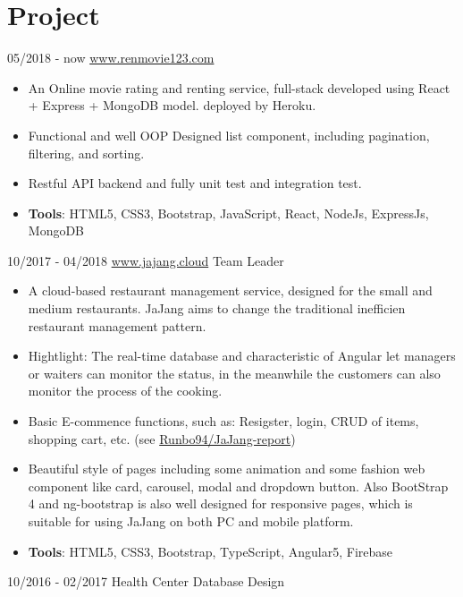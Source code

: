 \documentclass[letterpaper]{twentysecondcv} %
\begin{document}
\section{Project}
\begin{twenty}
	\twentyitem
	{05/2018}
	{- now}
	{\href{www.renmovie123.com}{www.renmovie123.com}}
	{}
	{}
	{
		{\begin{itemize}
				\item An Online movie rating and renting service, full-stack developed using React + Express + MongoDB model.
				deployed by Heroku.
				\item Functional and well OOP Designed list component, including pagination, filtering, and sorting.
				\item Restful API backend and fully unit test and integration test.
				\item \textbf{Tools}: HTML5, CSS3, Bootstrap, JavaScript, React, NodeJs, ExpressJs, MongoDB  \vspace{2mm}
		\end{itemize}}
	}
	\twentyitem
	{10/2017}
	{- 04/2018}
	{\href{www.jajang.cloud}{www.jajang.cloud}}
	{}
	{Team Leader}
	{
		{\begin{itemize}
				\item A cloud-based restaurant management service, designed for the small and medium restaurants. JaJang aims to change the traditional inefficien restaurant management pattern.
				\item Hightlight: The real-time database and characteristic of Angular let managers or waiters can monitor the status, in the meanwhile the customers can also monitor the process of the cooking. 
				\item Basic E-commence functions, such as: Resigster, login, CRUD of items, shopping cart, etc. (see \href{https://github.com/Runbo94/JaJang-report}{Runbo94/JaJang-report})
				\item Beautiful style of pages including some animation and some fashion web component like card, carousel, modal and dropdown button. Also BootStrap 4 and ng-bootstrap
				is also well designed for responsive pages, which is suitable for using JaJang on both PC and mobile platform.
				\item \textbf{Tools}: HTML5, CSS3, Bootstrap, TypeScript, Angular5, Firebase \vspace{2mm}
		\end{itemize}}
	}
	\twentyitem
	{10/2016}
	{- 02/2017}
	{Health Center Database Design}
	{}
	{}
	{
		{\begin{itemize}

\end{itemize}}}
\end{twenty}
\end{document}
